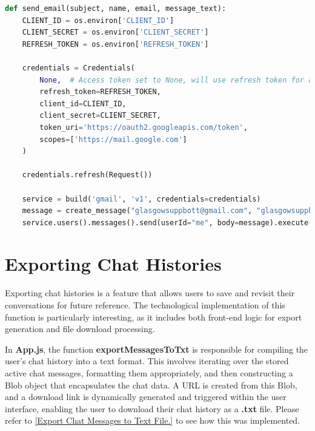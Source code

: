 \documentclass{l4proj}
\begin{document}
\begin{lstlisting}[language=Python, caption={OAuth 2.0 \& Gmail API}]
def send_email(subject, name, email, message_text):
    CLIENT_ID = os.environ['CLIENT_ID']
    CLIENT_SECRET = os.environ['CLIENT_SECRET']
    REFRESH_TOKEN = os.environ['REFRESH_TOKEN']

    credentials = Credentials(
        None,  # Access token set to None, will use refresh token for access
        refresh_token=REFRESH_TOKEN,
        client_id=CLIENT_ID,
        client_secret=CLIENT_SECRET,
        token_uri='https://oauth2.googleapis.com/token',
        scopes=['https://mail.google.com']
    )

    credentials.refresh(Request())

    service = build('gmail', 'v1', credentials=credentials)
    message = create_message("glasgowsuppbott@gmail.com", "glasgowsuppbfeedback@gmail.com", subject, message_text)
    service.users().messages().send(userId="me", body=message).execute()
\end{lstlisting}

\section{Exporting Chat Histories}

Exporting chat histories is a feature that allows users to save and revisit their conversations for future reference. The technological implementation of this function is particularly interesting, as it includes both front-end logic for export generation and file download processing.

In \textbf{App.js}, the function \textbf{exportMessagesToTxt} is responsible for compiling the user's chat history into a text format. This involves iterating over the stored active chat messages, formatting them appropriately, and then constructing a Blob object that encapsulates the chat data. A URL is created from this Blob, and a download link is dynamically generated and triggered within the user interface, enabling the user to download their chat history as a \textbf{.txt} file. Please refer to \ref{Export Chat Messages to Text File.} to see how this was implemented.
\end{document}
